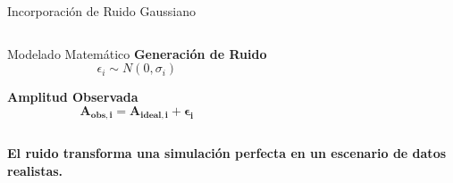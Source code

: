 \begin{frame}{Incorporación de Ruido Gaussiano}
\begin{columns}[T]
\begin{exampleblock}{Modelado Matemático}
            \textbf{Generación de Ruido}
            \[ \epsilon_i \sim N(0, \sigma_i) \]
            
            \textbf{Amplitud Observada}
            \[ \mathbf{A_{obs,i} = A_{ideal,i} + \epsilon_i} \]
        \end{exampleblock}
    \end{columns}

    \vspace{0.4cm}
    \begin{center}
        \footnotesize 
        \textbf{El ruido transforma una simulación perfecta en un escenario de datos realistas.}
    \end{center}

\end{frame}